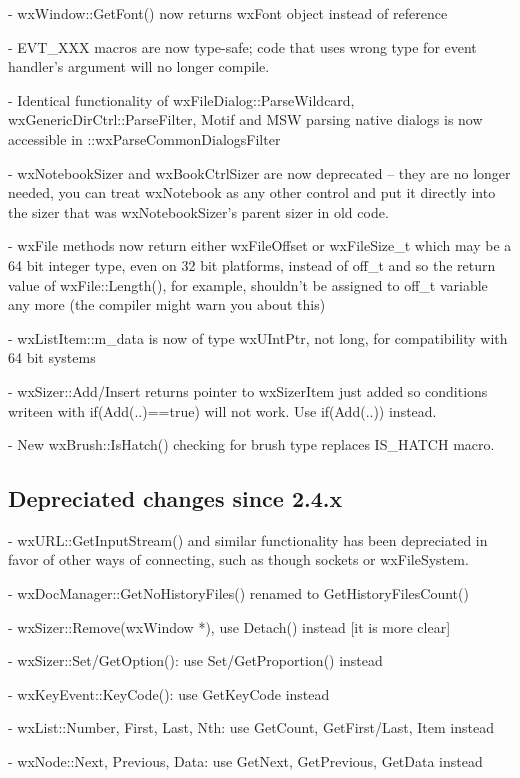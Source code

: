 - wxWindow::GetFont() now returns wxFont object instead of reference

- EVT\_XXX macros are now type-safe; code that uses wrong type for event
  handler's argument will no longer compile.

- Identical functionality of wxFileDialog::ParseWildcard,
  wxGenericDirCtrl::ParseFilter, Motif and MSW parsing native dialogs
  is now accessible in ::wxParseCommonDialogsFilter

- wxNotebookSizer and wxBookCtrlSizer are now deprecated -- they are no longer
  needed, you can treat wxNotebook as any other control and put it directly
  into the sizer that was wxNotebookSizer's parent sizer in old code.

- wxFile methods now return either wxFileOffset or wxFileSize\_t which may be a
  64 bit integer type, even on 32 bit platforms, instead of off\_t and so the
  return value of wxFile::Length(), for example, shouldn't be assigned to off\_t
  variable any more (the compiler might warn you about this)

- wxListItem::m\_data is now of type wxUIntPtr, not long, for compatibility
  with 64 bit systems

- wxSizer::Add/Insert returns pointer to wxSizerItem just added so conditions
  writeen with if(Add(..)==true) will not work. Use if(Add(..)) instead.

- New wxBrush::IsHatch() checking for brush type replaces IS_HATCH macro.

\subsection{Depreciated changes since 2.4.x}\label{depreciatedsince24}

- wxURL::GetInputStream() and similar functionality has been depreciated in
  favor of other ways of connecting, such as though sockets or wxFileSystem.

- wxDocManager::GetNoHistoryFiles() renamed to GetHistoryFilesCount()

- wxSizer::Remove(wxWindow *), use Detach() instead [it is more clear]

- wxSizer::Set/GetOption(): use Set/GetProportion() instead

- wxKeyEvent::KeyCode(): use GetKeyCode instead

- wxList::Number, First, Last, Nth: use GetCount, GetFirst/Last, Item instead

- wxNode::Next, Previous, Data: use GetNext, GetPrevious, GetData instead

